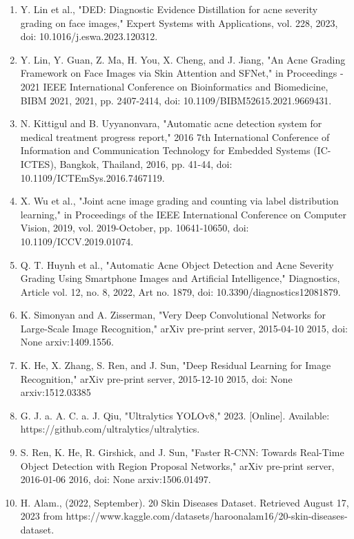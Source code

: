 \documentclass[16pt]{extarticle}
\begin{document}
\begin{enumerate}
  quantification scheme using deep learning," Biomedical Signal
  Processing and Control, vol. 84, 2023, doi:
  10.1016/j.bspc.2023.104803.
\item
  Y. Lin et al., "DED: Diagnostic Evidence Distillation for acne
  severity grading on face images," Expert Systems with Applications,
  vol. 228, 2023, doi: 10.1016/j.eswa.2023.120312.
\item
  Y. Lin, Y. Guan, Z. Ma, H. You, X. Cheng, and J. Jiang, "An Acne
  Grading Framework on Face Images via Skin Attention and SFNet," in
  Proceedings - 2021 IEEE International Conference on Bioinformatics and
  Biomedicine, BIBM 2021, 2021, pp. 2407-2414, doi:
  10.1109/BIBM52615.2021.9669431.
\item
  N. Kittigul and B. Uyyanonvara, "Automatic acne detection system for
  medical treatment progress report," 2016 7th International Conference
  of Information and Communication Technology for Embedded Systems
  (IC-ICTES), Bangkok, Thailand, 2016, pp. 41-44, doi:
  10.1109/ICTEmSys.2016.7467119.
\item
  X. Wu et al., "Joint acne image grading and counting via label
  distribution learning," in Proceedings of the IEEE International
  Conference on Computer Vision, 2019, vol. 2019-October, pp.
  10641-10650, doi: 10.1109/ICCV.2019.01074.
\item
  Q. T. Huynh et al., "Automatic Acne Object Detection and Acne Severity
  Grading Using Smartphone Images and Artificial Intelligence,"
  Diagnostics, Article vol. 12, no. 8, 2022, Art no. 1879, doi:
  10.3390/diagnostics12081879.
\item
  K. Simonyan and A. Zisserman, "Very Deep Convolutional Networks for
  Large-Scale Image Recognition," arXiv pre-print server, 2015-04-10
  2015, doi: None arxiv:1409.1556.
\item
  K. He, X. Zhang, S. Ren, and J. Sun, "Deep Residual Learning for Image
  Recognition," arXiv pre-print server, 2015-12-10 2015, doi: None
  arxiv:1512.03385
\item
  G. J. a. A. C. a. J. Qiu, "Ultralytics YOLOv8," 2023. {[}Online{]}.
  Available: https://github.com/ultralytics/ultralytics.
\item
  S. Ren, K. He, R. Girshick, and J. Sun, "Faster R-CNN: Towards
  Real-Time Object Detection with Region Proposal Networks," arXiv
  pre-print server, 2016-01-06 2016, doi: None arxiv:1506.01497.
\item
  H. Alam., (2022, September). 20 Skin Diseases Dataset. Retrieved
  August 17, 2023 from
  https://www.kaggle.com/datasets/haroonalam16/20-skin-diseases-dataset.

\end{enumerate}
\end{document}
